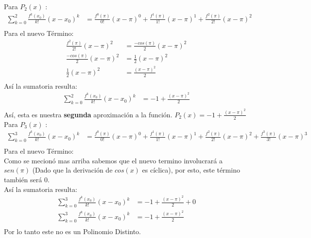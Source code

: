 Para $P_{2}(x)$ :
\begin{align*}
   \sum_{k=0}^{2} \frac{f^{k}(x_{0})}{k!}(x-x_{0})^{k} &= \frac{f^{0}(\pi)}{0!}(x-\pi)^{0} + \frac{f^{1}(\pi)}{1!}(x-\pi)^{1} + \frac{f^{2}(\pi)}{2!}(x-\pi)^{2}\\
\end{align*}
Para el nuevo Término:
\begin{align*}
   \frac{f^{2}(\pi)}{2!}(x-\pi)^{2}                    &= \frac{-cos(\pi)}{2}(x-\pi)^{2} \\
   \frac{-cos(\pi)}{2}(x-\pi)^{2}                      &= \frac{1}{2}(x-\pi)^{2}\\
   \frac{1}{2}(x-\pi)^{2}                              &= \frac{(x-\pi)^{2}}{2}\\
\end{align*}
Así la sumatoria resulta:
\begin{align*}
   \sum_{k=0}^{2} \frac{f^{k}(x_{0})}{k!}(x-x_{0})^{k} &= -1 + \frac{(x-\pi)^{2}}{2}\\
\end{align*}
Así, esta es nuestra \textbf{segunda} aproximación a la función. $P_{2}(x) = -1 + \frac{(x-\pi)^{2}}{2}$ \\

Para $P_{3}(x)$ :
\begin{align*}
   \sum_{k=0}^{3} \frac{f^{k}(x_{0})}{k!}(x-x_{0})^{k} &= \frac{f^{0}(\pi)}{0!}(x-\pi)^{0} + \frac{f^{1}(\pi)}{1!}(x-\pi)^{1} + \frac{f^{2}(\pi)}{2!}(x-\pi)^{2} + \frac{f^{3}(\pi)}{3!}(x-\pi)^{3}\\
\end{align*}
Para el nuevo Término: \\
Como se mecionó mas arriba sabemos que el nuevo termino involucrará a $sen(\pi)$ (Dado que la derivación de $cos(x)$ es cíclica), por esto, este término también será 0. \\
\newline
Así la sumatoria resulta:
\begin{align*}
   \sum_{k=0}^{3} \frac{f^{k}(x_{0})}{k!}(x-x_{0})^{k} &= -1 + \frac{(x-\pi)^{2}}{2} + 0\\
   \sum_{k=0}^{3} \frac{f^{k}(x_{0})}{k!}(x-x_{0})^{k} &= -1 + \frac{(x-\pi)^{2}}{2} \\
\end{align*}
Por lo tanto este no es un Polinomio Distinto. \\

